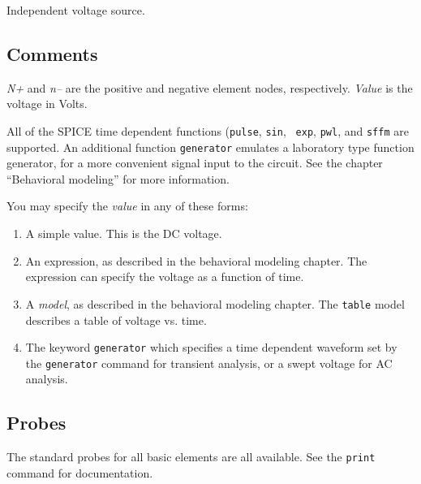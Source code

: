 Independent voltage source.
\subsection{Comments}

{\it N+} and {\it n--} are the positive and negative element nodes,
respectively.  {\it Value} is the voltage in Volts.

All of the SPICE time dependent functions ({\tt pulse}, {\tt sin}, {\tt
exp}, {\tt pwl}, and {\tt sffm} are supported.  An additional
function {\tt generator} emulates a laboratory type function generator, for
a more convenient signal input to the circuit.
See the chapter ``Behavioral modeling'' for more information.

You may specify the {\it value} in any of these forms:

\begin{enumerate}
  
\item
A simple value.  This is the DC voltage.
  
\item
An expression, as described in the behavioral modeling chapter.  The
expression can specify the voltage as a function of time.

\item
A {\it model}, as described in the behavioral modeling chapter.  The
{\tt table} model describes a table of voltage vs. time.

\item
The keyword {\tt generator} which specifies a time dependent waveform
set by the {\tt generator} command for transient analysis, or a swept
voltage for AC analysis.

\end{enumerate}
\subsection{Probes}

The standard probes for all basic elements are all available.  See the
{\tt print} command for documentation.
